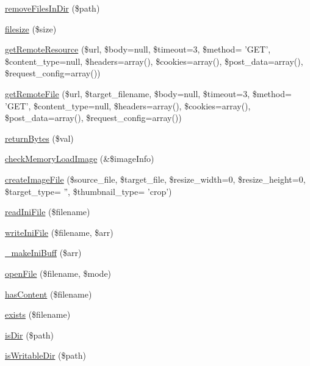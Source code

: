 \begin{DoxyCompactItemize}
\hyperlink{classFileHandler_a07839b4971e9ef40039d23ea65977d69}{remove\+Files\+In\+Dir} (\$path)
\item 
\hyperlink{classFileHandler_ae235b4ded589fb13caed260fabc0a30c}{filesize} (\$size)
\item 
\hyperlink{classFileHandler_a602c039b415c15d9d6866e586282faf7}{get\+Remote\+Resource} (\$url, \$body=null, \$timeout=3, \$method= 'G\+E\+T', \$content\+\_\+type=null, \$headers=array(), \$cookies=array(), \$post\+\_\+data=array(), \$request\+\_\+config=array())
\item 
\hyperlink{classFileHandler_a0e3720cacd0137d537834376ce7b982b}{get\+Remote\+File} (\$url, \$target\+\_\+filename, \$body=null, \$timeout=3, \$method= 'G\+E\+T', \$content\+\_\+type=null, \$headers=array(), \$cookies=array(), \$post\+\_\+data=array(), \$request\+\_\+config=array())
\item 
\hyperlink{classFileHandler_a79dd068137470965b560f4d23d978e7d}{return\+Bytes} (\$val)
\item 
\hyperlink{classFileHandler_a0b240e89b6ce57cb94e855fc25e5e9f3}{check\+Memory\+Load\+Image} (\&\$image\+Info)
\item 
\hyperlink{classFileHandler_a171948d79c14415ad45b7581a011c593}{create\+Image\+File} (\$source\+\_\+file, \$target\+\_\+file, \$resize\+\_\+width=0, \$resize\+\_\+height=0, \$target\+\_\+type= '', \$thumbnail\+\_\+type= 'crop')
\item 
\hyperlink{classFileHandler_a58a8bbae1ab4acb358599db38a47db4d}{read\+Ini\+File} (\$filename)
\item 
\hyperlink{classFileHandler_aa0fd9ce8f2c81bee472a403e75b578bd}{write\+Ini\+File} (\$filename, \$arr)
\item 
\hyperlink{classFileHandler_a8975f9247987757497e0288f3ee09173}{\+\_\+make\+Ini\+Buff} (\$arr)
\item 
\hyperlink{classFileHandler_a690753d8cf8ff837f28a811cdfbfa069}{open\+File} (\$filename, \$mode)
\item 
\hyperlink{classFileHandler_ad872016e83b1f62a03d54e359ce31f73}{has\+Content} (\$filename)
\item 
\hyperlink{classFileHandler_a862c4f6349792ae8f094ec456c9a26ed}{exists} (\$filename)
\item 
\hyperlink{classFileHandler_a5fd371542d6f1a86269d0b8795e74471}{is\+Dir} (\$path)
\item 
\hyperlink{classFileHandler_a9494e34a28f27b6a1ab2e032aada2bbb}{is\+Writable\+Dir} (\$path)
\end{DoxyCompactItemize}



